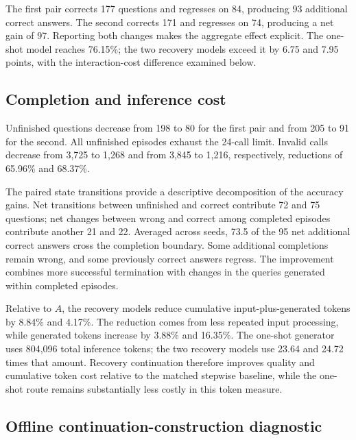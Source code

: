 The first pair corrects 177 questions and regresses on 84, producing 93 additional correct answers. The second corrects 171 and regresses on 74, producing a net gain of 97. Reporting both changes makes the aggregate effect explicit. The one-shot model reaches 76.15\%; the two recovery models exceed it by 6.75 and 7.95 points, with the interaction-cost difference examined below.

\subsection{Completion and inference cost}

\begin{table}[htbp]
 \centering
 \caption{Execution and cumulative inference cost on the held-out set. Tokens count repeated full histories across turns.}
 \label{tab:cost-en}
 \RecoveryCostTableEN
\end{table}

Unfinished questions decrease from 198 to 80 for the first pair and from 205 to 91 for the second. All unfinished episodes exhaust the 24-call limit. Invalid calls decrease from 3,725 to 1,268 and from 3,845 to 1,216, respectively, reductions of 65.96\% and 68.37\%.

The paired state transitions provide a descriptive decomposition of the accuracy gains. Net transitions between unfinished and correct contribute 72 and 75 questions; net changes between wrong and correct among completed episodes contribute another 21 and 22. Averaged across seeds, 73.5 of the 95 net additional correct answers cross the completion boundary. Some additional completions remain wrong, and some previously correct answers regress. The improvement combines more successful termination with changes in the queries generated within completed episodes.

Relative to $A$, the recovery models reduce cumulative input-plus-generated tokens by 8.84\% and 4.17\%. The reduction comes from less repeated input processing, while generated tokens increase by 3.88\% and 16.35\%. The one-shot generator uses 804,096 total inference tokens; the two recovery models use 23.64 and 24.72 times that amount. Recovery continuation therefore improves quality and cumulative token cost relative to the matched stepwise baseline, while the one-shot route remains substantially less costly in this token measure.

\subsection{Offline continuation-construction diagnostic}

